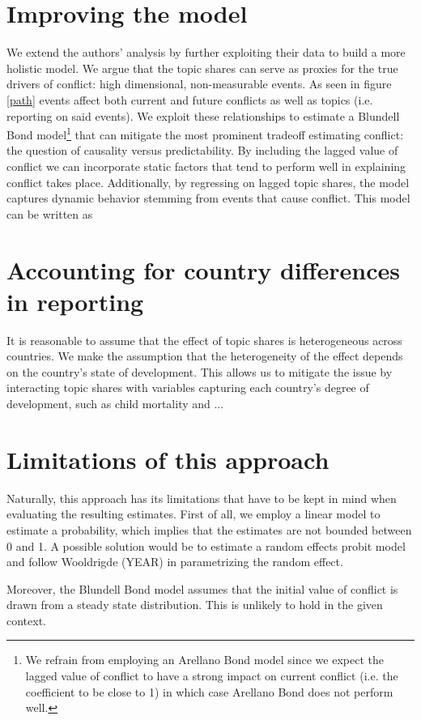\section{Improving the model}
We extend the authors' analysis by further exploiting their data to build a more holistic model.
We argue that the topic shares can serve as proxies for the true drivers of conflict: high dimensional, non-measurable events.
As seen in figure \ref{path} events affect both current and future conflicts as well as topics (i.e. reporting on said events).
We exploit these relationships to estimate a Blundell Bond model\footnote{We refrain from employing an Arellano Bond model since we expect the lagged value of conflict to have a strong impact on current conflict (i.e. the coefficient to be close to 1) in which case Arellano Bond does not perform well.} that can mitigate the most prominent tradeoff estimating conflict: the question of causality versus predictability.
By including the lagged value of conflict we can incorporate static factors that tend to perform well in explaining  conflict takes place.
Additionally, by regressing on lagged topic shares, the model captures dynamic behavior stemming from events that cause conflict.
This model can be written as

\section{Accounting for country differences in reporting}
It is reasonable to assume that the effect of topic shares is heterogeneous across countries.
We make the assumption that the heterogeneity of the effect depends on the country's state of development.
This allows us to mitigate the issue by interacting topic shares with variables capturing each country's degree of development, such as child mortality and ...

\section{Limitations of this approach}
Naturally, this approach has its limitations that have to be kept in mind when evaluating the resulting estimates.
First of all, we employ a linear model to estimate a probability, which implies that the estimates are not bounded between 0 and 1.
A possible solution would be to estimate a random effects probit model and follow Wooldrigde (YEAR) in parametrizing the random effect.

Moreover, the Blundell Bond model assumes that the initial value of conflict is drawn from a steady state distribution.
This is unlikely to hold in the given context.


